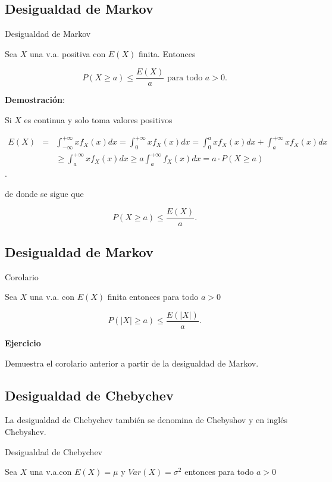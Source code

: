 \documentclass[]{book}
\begin{document}
\hypertarget{desigualdad-de-markov}{%
\subsection{Desigualdad de Markov}\label{desigualdad-de-markov}}

 Desigualdad de Markov

Sea \(X\) una v.a. positiva con \(E(X)\) finita. Entonces

\[P(X\geq a)\leq \frac{E(X)}{a}\mbox{ para todo }a>0.\]

\textbf{Demostración}:

Si \(X\) es continua y solo toma valores positivos

\begin{eqnarray*}
E(X) &=& \int_{-\infty}^{+\infty} x f_{X}(x) dx=  \int_0^{+\infty} x f_{X}(x) dx=  \int_0^{a} x f_{X}(x) dx +\int_{a}^{+\infty} x f_{X}(x) dx \\
& &\geq   \int_{a}^{+\infty} x
f_{X}(x) dx \geq a \int_{a}^{+\infty}
f_{X}(x) dx = a \cdot  P(X\geq a)
\end{eqnarray*}.

de donde se sigue que

\[P(X\geq a)\leq \frac{E(X)}{a}.\]

\hypertarget{desigualdad-de-markov-1}{%
\subsection{Desigualdad de Markov}\label{desigualdad-de-markov-1}}

 Corolario

Sea \(X\) una v.a. con \(E(X)\) finita entonces para todo \(a>0\)

\[P(|X|\geq a )\leq \frac{E(|X|)}{a}.\]

\textbf{Ejercicio}

Demuestra el corolario anterior a partir de la desigualdad de Markov.

\hypertarget{desigualdad-de-chebychev}{%
\subsection{Desigualdad de Chebychev}\label{desigualdad-de-chebychev}}

La desigualdad de Chebychev también se denomina de Chebyshov y en inglés Chebyshev.

 Desigualdad de Chebychev

Sea \(X\) una v.a.con \(E(X)=\mu\) y \(Var(X)=\sigma^2\) entonces para todo \(a>0\)
\end{document}

